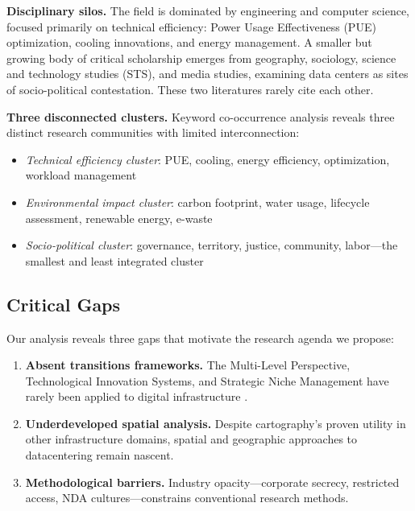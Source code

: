 \documentclass[../../main.tex]{subfiles}
\begin{document}
\textbf{Disciplinary silos.} The field is dominated by engineering and computer science, focused primarily on technical efficiency: Power Usage Effectiveness (PUE) optimization, cooling innovations, and energy management. A smaller but growing body of critical scholarship emerges from geography, sociology, science and technology studies (STS), and media studies, examining data centers as sites of socio-political contestation. These two literatures rarely cite each other.

\textbf{Three disconnected clusters.} Keyword co-occurrence analysis reveals three distinct research communities with limited interconnection:

\begin{itemize}
    \item \textit{Technical efficiency cluster}: PUE, cooling, energy efficiency, optimization, workload management
    \item \textit{Environmental impact cluster}: carbon footprint, water usage, lifecycle assessment, renewable energy, e-waste
    \item \textit{Socio-political cluster}: governance, territory, justice, community, labor---the smallest and least integrated cluster
\end{itemize}

\subsection{Critical Gaps}

Our analysis reveals three gaps that motivate the research agenda we propose:

\begin{enumerate}
    \item \textbf{Absent transitions frameworks.} The Multi-Level Perspective, Technological Innovation Systems, and Strategic Niche Management have rarely been applied to digital infrastructure .
    \item \textbf{Underdeveloped spatial analysis.} Despite cartography's proven utility in other infrastructure domains, spatial and geographic approaches to datacentering remain nascent.
    \item \textbf{Methodological barriers.} Industry opacity---corporate secrecy, restricted access, NDA cultures---constrains conventional research methods.
\end{enumerate}

\end{document}
